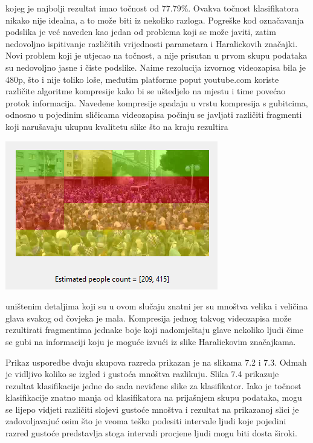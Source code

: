 \documentclass[times, utf8, zavrsni]{fer}
\begin{document}
\bigbreak

kojeg je najbolji rezultat imao točnost od 77.79\%. Ovakva točnost klasifikatora nikako
nije idealna, a to može biti iz nekoliko razloga. Pogreške kod označavanja podslika je 
već naveden kao jedan od problema koji se može javiti, zatim nedovoljno ispitivanje
različitih vrijednosti parametara i Haralickovih značajki. Novi problem koji je utjecao
na točnost, a nije prisutan u prvom skupu podataka su nedovoljno jasne i čiste podslike.
Naime rezolucija izvornog videozapisa bila je 480p, što i nije toliko loše, međutim platforme 
poput youtube.com koriste različite algoritme kompresije kako bi se uštedjelo na mjestu i 
time povećao protok informacija. Navedene kompresije spadaju u vrstu kompresija s gubitcima, 
odnosno u pojedinim sličicama videozapisa počinju se javljati različiti fragmenti koji narušavaju 
ukupnu kvalitetu slike što na kraju rezultira

\bigbreak

\begin{minipage}{\linewidth}
\centering
\includegraphics{img/clas2.png}
\end{minipage}

\noindent uništenim detaljima koji su u ovom slučaju znatni jer su mnoštva velika i veličina glava 
svakog od čovjeka je mala. Kompresija jednog takvog videozapisa može rezultirati 
fragmentima jednake boje koji nadomještaju glave nekoliko
ljudi čime se gubi na informaciji koju je moguće izvući iz slike Haralickovim značajkama.

\bigbreak

Prikaz usporedbe dvaju skupova razreda prikazan je na slikama 7.2 i 7.3. Odmah je vidljivo 
koliko se izgled i gustoća mnoštva razlikuju. Slika 7.4 prikazuje rezultat klasifikacije jedne do sada
neviđene slike za klasifikator. Iako je točnost klasifikacije znatno manja od klasifikatora na prijašnjem
skupu podataka, mogu se lijepo vidjeti različiti slojevi gustoće mnoštva i rezultat na prikazanoj slici
je zadovoljavajuć osim što je veoma teško podesiti intervale ljudi koje pojedini razred gustoće 
predstavlja stoga intervali procjene ljudi mogu biti dosta široki. 
\end{document}
